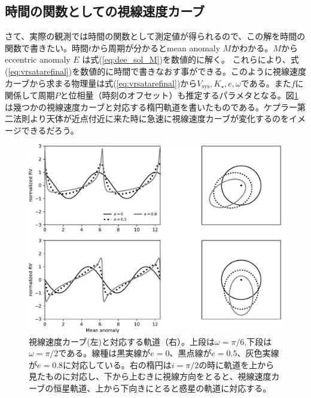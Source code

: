\subsection*{時間の関数としての視線速度カーブ}

さて、実際の観測では時間の関数として測定値が得られるので、この解を時間の関数で書きたい。時間$t$から周期が分かるとmean anomaly $M$かわかる。$M$からeccentric anomaly $E$ は式(\ref{eq:dee_sol_M})を数値的に解く。
これらにより、式(\ref{eq:vrsatarefinal})を数値的に時間で書きなおす事ができる。このように視線速度カーブから求まる物理量は式(\ref{eq:vrsatarefinal})から$V_\mathrm{sys}, K_\star, e, \omega$である。また$f$に関係して周期$P$と位相量（時刻のオフセット）も推定するパラメタとなる。図\ref{fig:rvsim}は幾つかの視線速度カーブと対応する楕円軌道を書いたものである。ケプラー第二法則より天体が近点付近に来た時に急速に視線速度カーブが変化するのをイメージできるだろう。

\begin{figure}[]
 \begin{center}
	\includegraphics[width=\linewidth]{fig/rvsim.pdf}
\end{center}
	\caption{視線速度カーブ(左)と対応する軌道（右）。上段は$\omega=\pi/6$,下段は$\omega=\pi/2$である。線種は黒実線が$e=0$、黒点線が$e=0.5$、灰色実線が$e=0.8$に対応している。右の楕円は$i=\pi/2$の時に軌道を上から見たものに対応し、下から上むきに視線方向をとると、視線速度カーブの恒星軌道、上から下向きにとると惑星の軌道に対応する。\label{fig:rvsim}}	
\end{figure} 


